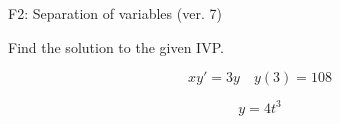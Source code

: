 \begin{exercise}
  \begin{exerciseTitle}F2: Separation of variables (ver. 7)\end{exerciseTitle}
  \begin{exerciseStatement}
    
Find the solution to the given IVP.

    
\[xy'= 3 y \hspace{1em} y( 3 ) = 108\]

  \end{exerciseStatement}
  \begin{exerciseAnswer}
    
\[y= 4 t^ 3\]

  \end{exerciseAnswer}
\end{exercise}